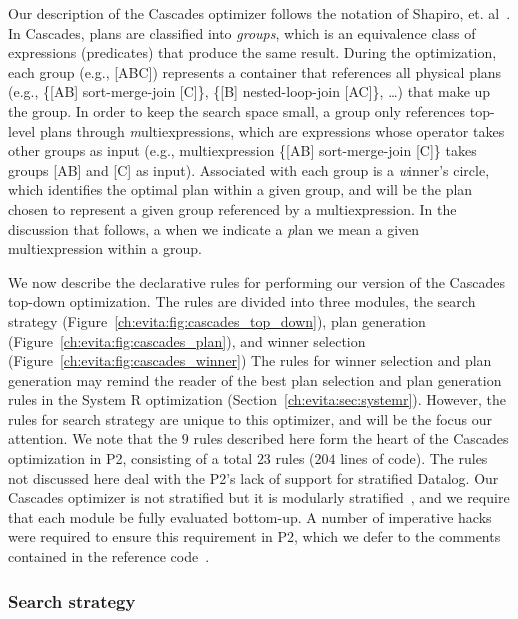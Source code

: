 Our description of the Cascades optimizer follows the notation of Shapiro, et.
al~\cite{Shapiro-opt}.  In Cascades, plans are classified into {\em groups},
which is an equivalence class of expressions (predicates) that produce the same
result.  During the optimization, each group (e.g., [ABC]) represents a
container that references all physical plans (e.g., \{[AB] sort-merge-join
[C]\}, \{[B] nested-loop-join [AC]\}, \ldots) that make up the group.  In order
to keep the search space small, a group only references top-level plans through
{\emph multiexpressions}, which are expressions whose operator takes other
groups as input (e.g., multiexpression \{[AB] sort-merge-join [C]\} takes groups [AB] and
[C] as input).  Associated with each group is a {\emph winner's circle}, which
identifies the optimal plan within a given group, and will be the plan chosen
to represent a given group referenced by a multiexpression.  In the discussion
that follows, a when we indicate a {\emph plan} we mean a given multiexpression
within a group.

We now describe the declarative rules for performing our version of the
Cascades top-down optimization.  The rules are divided into three modules, the
search strategy (Figure~\ref{ch:evita:fig:cascades_top_down}), plan generation
(Figure~\ref{ch:evita:fig:cascades_plan}), and winner selection
(Figure~\ref{ch:evita:fig:cascades_winner}) The rules for winner selection and
plan generation may remind the reader of the best plan selection and plan
generation rules in the System R optimization
(Section~\ref{ch:evita:sec:systemr}).  However, the rules for search strategy
are unique to this optimizer, and will be the focus our attention.
We note that the $9$ rules described here form the
heart of the Cascades optimization in P2, consisting of a total $23$ rules
($204$ lines of code).  The rules not discussed here deal with the P2's lack of
support for stratified Datalog.  Our Cascades optimizer is not stratified but
it is modularly stratified~\cite{rossmodular}, and we require that
each module be fully evaluated bottom-up.  A number of imperative hacks were
required to ensure this requirement in P2, which we defer to the comments
contained in the reference code~\cite{p2code}.

\subsubsection{Search strategy}


